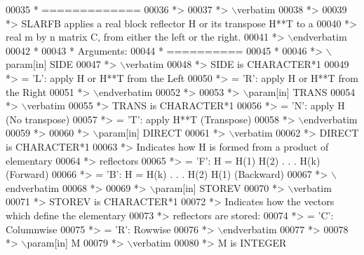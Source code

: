 \begin{DoxyCode}
00035 \textcolor{comment}{*  =============}
00036 \textcolor{comment}{*>}
00037 \textcolor{comment}{*> \(\backslash\)verbatim}
00038 \textcolor{comment}{*>}
00039 \textcolor{comment}{*> SLARFB applies a real block reflector H or its transpose H**T to a}
00040 \textcolor{comment}{*> real m by n matrix C, from either the left or the right.}
00041 \textcolor{comment}{*> \(\backslash\)endverbatim}
00042 \textcolor{comment}{*}
00043 \textcolor{comment}{*  Arguments:}
00044 \textcolor{comment}{*  ==========}
00045 \textcolor{comment}{*}
00046 \textcolor{comment}{*> \(\backslash\)param[in] SIDE}
00047 \textcolor{comment}{*> \(\backslash\)verbatim}
00048 \textcolor{comment}{*>          SIDE is CHARACTER*1}
00049 \textcolor{comment}{*>          = 'L': apply H or H**T from the Left}
00050 \textcolor{comment}{*>          = 'R': apply H or H**T from the Right}
00051 \textcolor{comment}{*> \(\backslash\)endverbatim}
00052 \textcolor{comment}{*>}
00053 \textcolor{comment}{*> \(\backslash\)param[in] TRANS}
00054 \textcolor{comment}{*> \(\backslash\)verbatim}
00055 \textcolor{comment}{*>          TRANS is CHARACTER*1}
00056 \textcolor{comment}{*>          = 'N': apply H (No transpose)}
00057 \textcolor{comment}{*>          = 'T': apply H**T (Transpose)}
00058 \textcolor{comment}{*> \(\backslash\)endverbatim}
00059 \textcolor{comment}{*>}
00060 \textcolor{comment}{*> \(\backslash\)param[in] DIRECT}
00061 \textcolor{comment}{*> \(\backslash\)verbatim}
00062 \textcolor{comment}{*>          DIRECT is CHARACTER*1}
00063 \textcolor{comment}{*>          Indicates how H is formed from a product of elementary}
00064 \textcolor{comment}{*>          reflectors}
00065 \textcolor{comment}{*>          = 'F': H = H(1) H(2) . . . H(k) (Forward)}
00066 \textcolor{comment}{*>          = 'B': H = H(k) . . . H(2) H(1) (Backward)}
00067 \textcolor{comment}{*> \(\backslash\)endverbatim}
00068 \textcolor{comment}{*>}
00069 \textcolor{comment}{*> \(\backslash\)param[in] STOREV}
00070 \textcolor{comment}{*> \(\backslash\)verbatim}
00071 \textcolor{comment}{*>          STOREV is CHARACTER*1}
00072 \textcolor{comment}{*>          Indicates how the vectors which define the elementary}
00073 \textcolor{comment}{*>          reflectors are stored:}
00074 \textcolor{comment}{*>          = 'C': Columnwise}
00075 \textcolor{comment}{*>          = 'R': Rowwise}
00076 \textcolor{comment}{*> \(\backslash\)endverbatim}
00077 \textcolor{comment}{*>}
00078 \textcolor{comment}{*> \(\backslash\)param[in] M}
00079 \textcolor{comment}{*> \(\backslash\)verbatim}
00080 \textcolor{comment}{*>          M is INTEGER}

\end{DoxyCode}
